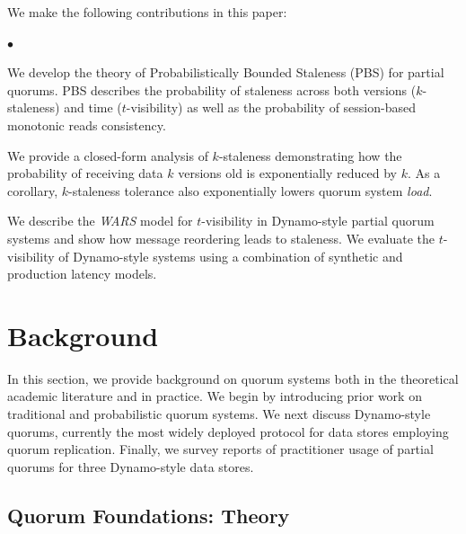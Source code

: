 \documentclass{vldb}
\newcommand{\sectionskip}{-0em}
\newcommand{\subsectionskip}{-0em}
\newenvironment{myitemize}
{
   \vspace{0mm}
    \begin{list}{$\bullet$ }{}
        \setlength{\topsep}{0em}
        \setlength{\parskip}{0pt}
        \setlength{\partopsep}{0pt}
        \setlength{\parsep}{0pt}         
        \setlength{\itemsep}{1mm} 
}
{
    \end{list} 
    \vspace{-1em}
}
\begin{document}
We make the following contributions in this paper:

\begin{myitemize}

\item We develop the theory of Probabilistically Bounded Staleness
  (PBS) for partial quorums. PBS describes the probability of
  staleness across both versions ($k$-staleness) and time
  ($t$-visibility) as well as the probability of session-based
  monotonic reads consistency.

\item We provide a closed-form analysis of $k$-staleness demonstrating
  how the probability of receiving data $k$ versions old is
  exponentially reduced by $k$.  As a corollary, $k$-staleness tolerance also
  exponentially lowers quorum system \textit{load}.

\item We describe the \textit{WARS} model for $t$-visibility in
  Dynamo-style partial quorum systems and show how message reordering
  leads to staleness.  We evaluate the $t$-visibility of Dynamo-style
  systems using a combination of synthetic and production latency
  models.

\end{myitemize}

\vspace{\sectionskip}\section{Background}
\label{sec:background}

In this section, we provide background on quorum systems both
in the theoretical academic literature and in practice.  We begin by
introducing prior work on traditional and probabilistic quorum
systems.  We next discuss Dynamo-style quorums, currently the most
widely deployed protocol for data stores employing quorum replication.
Finally, we survey reports of practitioner usage of partial quorums
for three Dynamo-style data stores.

\vspace{\subsectionskip}\subsection{Quorum Foundations: Theory}
\end{document}
